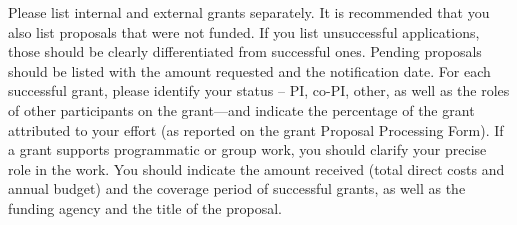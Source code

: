 Please list internal and external grants separately. 
It is recommended that you also list proposals that were not funded. 
If you list unsuccessful applications, those should be clearly differentiated from successful ones. 
Pending proposals should be listed with the amount requested and the notification date. 
For each successful grant, please identify your status -- PI, co-PI, other, as well as the roles of other participants on the grant—and indicate the percentage of the grant attributed to your effort (as reported on the grant Proposal Processing Form). 
If a grant supports programmatic or group work, you should clarify your precise role in the work. 
You should indicate the amount received (total direct costs and annual budget) and the coverage period of successful grants, as well as the funding agency and the title of the proposal.
